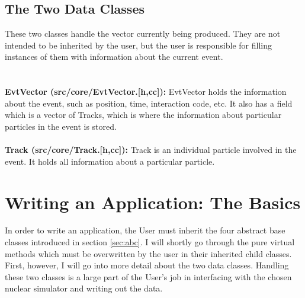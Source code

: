 \documentclass[12pt]{article}
\begin{document}
\subsection{The Two Data Classes}
These two classes handle the vector currently being produced.  They are not intended to be inherited by the user, but the user is responsible for filling instances of them with information about the current event.  
\\
\\
\\
\textbf{EvtVector (src/core/EvtVector.[h,cc]):} EvtVector holds the information about the event, such as position, time, interaction code, etc.  It also has a field which is a vector of Tracks, which is where the information about particular particles in the event is stored.
\\
\\
\textbf{Track (src/core/Track.[h,cc]):} Track is an individual particle involved in the event.  It holds all information about a particular particle.

\section{Writing an Application: The Basics}
\label{sec:writeanapp}
In order to write an application, the User must inherit the four abstract base classes introduced in section \ref{sec:abc}.  I will shortly go through the pure virtual methods which must be overwritten by the user in their inherited child classes.  First, however, I will go into more detail about the two data classes.  Handling these two classes is a large part of the User's job in interfacing with the chosen nuclear simulator and writing out the data.
\end{document}
